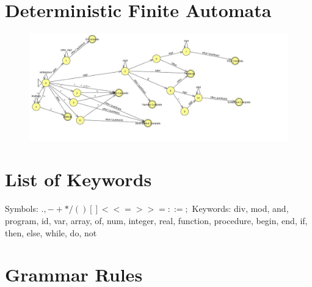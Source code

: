 \documentclass[10]{article}
\begin{document}
\newpage
\begin{appendices}
\section{Deterministic Finite Automata}
\begin{figure}[!ht]
	\includegraphics[width=\textwidth]{ScannerDFA.jpg}
\end{figure}
\section{List of Keywords}
Symbols: $ . , - + * / ( ) { } [ ] { } < <= > >= : := ;$  
\newline
Keywords: div, mod, and, program, id, var, array, of, num, integer, real, function, procedure, begin, end, if, then, else, while, do, not
\section{Grammar Rules}

\end{appendices}
\end{document}
